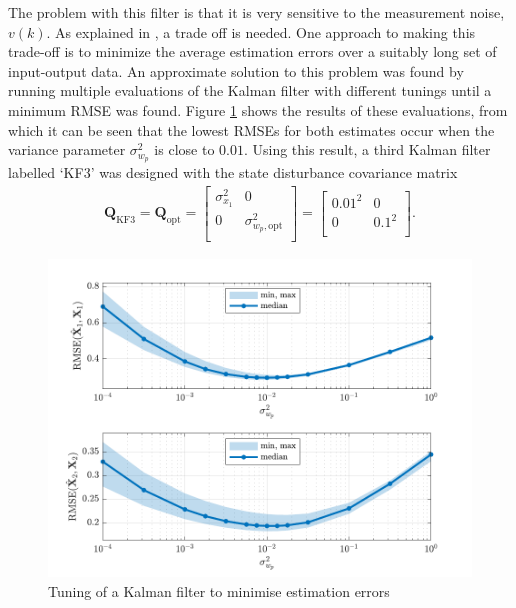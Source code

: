 The problem with this filter is that it is very sensitive to the measurement noise, $v(k)$. As explained in \cite{robertson_detection_1995}, a trade off is needed. One approach to making this trade-off is to minimize the average estimation errors over a suitably long set of input-output data. An approximate solution to this problem was found by running multiple evaluations of the Kalman filter with different tunings until a minimum RMSE was found. Figure \ref{fig:sim-sys-siso-KF3-tuning} shows the results of these evaluations, from which it can be seen that the lowest RMSEs for both estimates occur when the variance parameter $\sigma_{w_p}^2$ is close to $0.01$. Using this result, a third Kalman filter labelled `KF3' was designed with the state disturbance covariance matrix 
\begin{equation} \label{eq:sim-sys-siso-KF3-Q}
	\begin{aligned}
		\mathbf{Q}_{\text{KF3}}=\mathbf{Q}_{\text{opt}}=\begin{bmatrix}
			\sigma_{x_1}^2 & 0 \\
			0 & \sigma_{w_p,\text{opt}}^2 \\
		\end{bmatrix}=\begin{bmatrix}
			0.01^2 & 0 \\
			0 & 0.1^2 \\
		\end{bmatrix}.
	\end{aligned}
\end{equation}

\begin{figure}[htp]
	\centering
	\includegraphics[width=14cm]{images/rod_obs_sim1_plot_KF3_Q_statplot.pdf}
	\caption{Tuning of a Kalman filter to minimise estimation errors}
	\label{fig:sim-sys-siso-KF3-tuning}
\end{figure}

